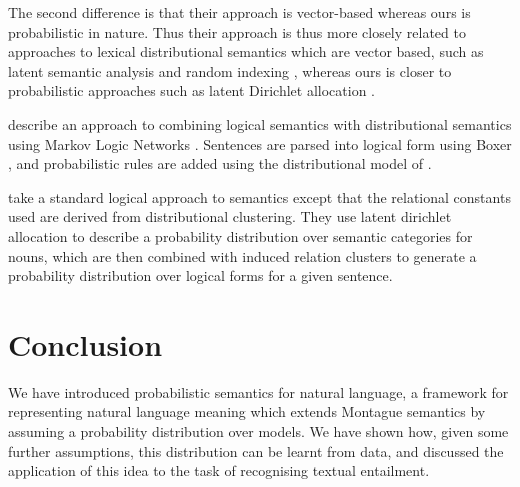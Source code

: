 \documentclass[letterpaper]{article}
\newcommand{\citet}[1]{\citeauthor{#1} \shortcite{#1}}
\begin{document}
The second difference is that their approach is vector-based whereas
ours is probabilistic in nature. Thus their approach is thus more
closely related to approaches to lexical distributional semantics
which are vector based, such as latent semantic analysis
\cite{Deerwester:90} and random indexing \cite{Sahlgren:02}, whereas
ours is closer to probabilistic approaches such as latent Dirichlet
allocation \cite{Blei:03}.

\citet{Garrette:11} describe an approach to combining logical
semantics with distributional semantics using Markov Logic Networks
\cite{Richardson:06}. Sentences are parsed into logical form using
Boxer \cite{Bos:04}, and probabilistic rules are added using the
distributional model of \citet{Erk:10}.

\citet{Lewis:13} take a standard logical approach to semantics except
that the relational constants used are derived from distributional
clustering. They use latent dirichlet allocation to describe a
probability distribution over semantic categories for nouns, which are
then combined with induced relation clusters to generate a probability
distribution over logical forms for a given sentence.

\section{Conclusion}

We have introduced probabilistic semantics for natural language, a
framework for representing natural language meaning which extends
Montague semantics by assuming a probability distribution over
models. We have shown how, given some further assumptions, this
distribution can be learnt from data, and discussed the application of
this idea to the task of recognising textual entailment.




\end{document}
